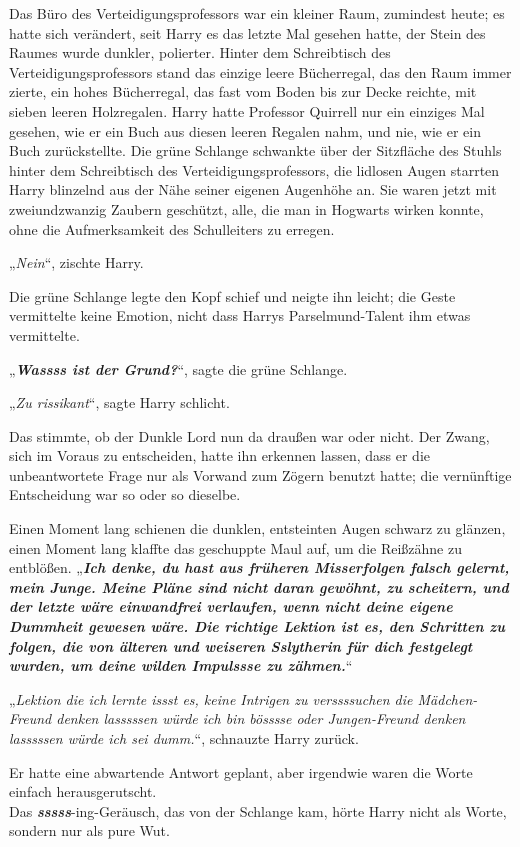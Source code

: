 {Das Büro des Verteidigungsprofessors war ein kleiner Raum, zumindest heute; es hatte sich verändert, seit Harry es das letzte Mal gesehen hatte, der Stein des Raumes wurde dunkler, polierter. Hinter dem Schreibtisch des Verteidigungsprofessors stand das einzige leere Bücherregal, das den Raum immer zierte, ein hohes Bücherregal, das fast vom Boden bis zur Decke reichte, mit sieben leeren Holzregalen. Harry hatte Professor Quirrell nur ein einziges Mal gesehen, wie er ein Buch aus diesen leeren Regalen nahm, und nie, wie er ein Buch zurückstellte. Die grüne Schlange schwankte über der Sitzfläche des Stuhls hinter dem Schreibtisch des Verteidigungsprofessors, die lidlosen Augen starrten Harry blinzelnd aus der Nähe seiner eigenen Augenhöhe an. Sie waren jetzt mit zweiundzwanzig Zaubern geschützt, alle, die man in Hogwarts wirken konnte, ohne die Aufmerksamkeit des Schulleiters zu erregen.

„\emph{Nein}“, zischte Harry.

Die grüne Schlange legte den Kopf schief und neigte ihn leicht; die Geste vermittelte keine Emotion, nicht dass Harrys Parselmund-Talent ihm etwas vermittelte.

„\textbf{\emph{Wassss ist der Grund?}}“, sagte die grüne Schlange.

„\emph{Zu rissikant}“, sagte Harry schlicht.

Das stimmte, ob der Dunkle Lord nun da draußen war oder nicht. Der Zwang, sich im Voraus zu entscheiden, hatte ihn erkennen lassen, dass er die unbeantwortete Frage nur als Vorwand zum Zögern benutzt hatte; die vernünftige Entscheidung war so oder so dieselbe.

Einen Moment lang schienen die dunklen, entsteinten Augen schwarz zu glänzen, einen Moment lang klaffte das geschuppte Maul auf, um die Reißzähne zu entblößen. „\textbf{\emph{Ich denke, du hast aus früheren Misserfolgen falsch gelernt, mein Junge. Meine Pläne sind nicht daran gewöhnt, zu scheitern, und der letzte wäre einwandfrei verlaufen, wenn nicht deine eigene Dummheit gewesen wäre. Die richtige Lektion ist es, den Schritten zu folgen, die von älteren und weiseren Sslytherin für dich festgelegt wurden, um deine wilden Impulssse zu zähmen.}}“

„\emph{Lektion die ich lernte issst es, keine Intrigen zu verssssuchen die Mädchen-Freund denken lasssssen würde ich bin bösssse oder Jungen-Freund denken lasssssen würde ich sei dumm.}“, schnauzte Harry zurück.

Er hatte eine abwartende Antwort geplant, aber irgendwie waren die Worte einfach herausgerutscht.\\ Das \textbf{\emph{sssss}}-ing-Geräusch, das von der Schlange kam, hörte Harry nicht als Worte, sondern nur als pure Wut.

}
